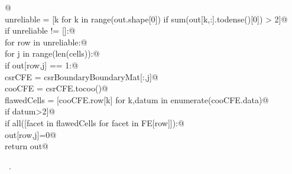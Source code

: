 \documentclass[11pt,oneside]{article}	%
\begin{document}
\begin{flushleft}
\begin{list}{}{}
\mbox{}\verb@   @\\
\mbox{}\verb@   unreliable = [k for k in range(out.shape[0]) if sum(out[k,:].todense()[0]) > 2]@\\
\mbox{}\verb@   if unreliable != []:@\\
\mbox{}\verb@      for row in unreliable:@\\
\mbox{}\verb@         for j in range(len(cells)):@\\
\mbox{}\verb@            if out[row,j] == 1:@\\
\mbox{}\verb@               csrCFE = csrBoundaryBoundaryMat[:,j]@\\
\mbox{}\verb@               cooCFE = csrCFE.tocoo()@\\
\mbox{}\verb@               flawedCells = [cooCFE.row[k] for k,datum in enumerate(cooCFE.data)@\\
\mbox{}\verb@                  if datum>2]@\\
\mbox{}\verb@               if all([facet in flawedCells  for facet in FE[row]]):@\\
\mbox{}\verb@                  out[row,j]=0@\\
\mbox{}\verb@   return out@\\
\mbox{}\verb@@{\NWsep}
\end{list}
\vspace{-1ex}
\footnotesize\addtolength{\baselineskip}{-1ex}
\begin{list}{}{\setlength{\itemsep}{-\parsep}\setlength{\itemindent}{-\leftmargin}}
\item \NWtxtMacroRefIn\ .
\end{list}
\end{flushleft}
\end{document}
